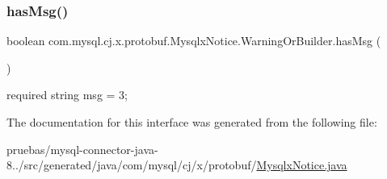 \subsubsection{\texorpdfstring{has\+Msg()}{hasMsg()}}
{\footnotesize\ttfamily boolean com.\+mysql.\+cj.\+x.\+protobuf.\+Mysqlx\+Notice.\+Warning\+Or\+Builder.\+has\+Msg (\begin{DoxyParamCaption}{ }\end{DoxyParamCaption})}

{\ttfamily required string msg = 3;} 

The documentation for this interface was generated from the following file\+:\begin{DoxyCompactItemize}
\item 
pruebas/mysql-\/connector-\/java-\/8../src/generated/java/com/mysql/cj/x/protobuf/\mbox{\hyperlink{_mysqlx_notice_8java}{Mysqlx\+Notice.\+java}}\end{DoxyCompactItemize}
